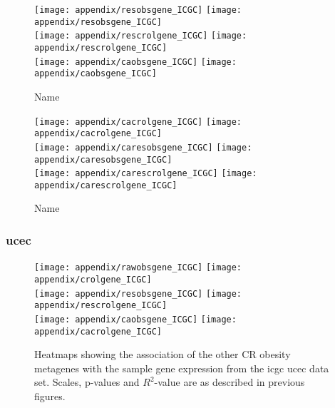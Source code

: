 \begin{appendices}
	\begin{figure}[htpb]
		\ContinuedFloat
		\captionsetup{list=off,format=cont}
		\centering
		\texttt{[image: appendix/resobsgene\_ICGC]}
		\hfill
		\texttt{[image: appendix/resobsgene\_ICGC]}\\
		\texttt{[image: appendix/rescrolgene\_ICGC]}
		\hfill
		\texttt{[image: appendix/rescrolgene\_ICGC]}\\
		\texttt{[image: appendix/caobsgene\_ICGC]}
		\hfill
		\texttt{[image: appendix/caobsgene\_ICGC]}\\
		\caption{Name}
	\end{figure}

	\begin{figure}[htpb]
		\ContinuedFloat
		\captionsetup{list=off,format=cont}
		\centering
		\texttt{[image: appendix/cacrolgene\_ICGC]}
		\hfill
		\texttt{[image: appendix/cacrolgene\_ICGC]}\\
		\texttt{[image: appendix/caresobsgene\_ICGC]}
		\hfill
		\texttt{[image: appendix/caresobsgene\_ICGC]}\\
		\texttt{[image: appendix/carescrolgene\_ICGC]}
		\hfill
		\texttt{[image: appendix/carescrolgene\_ICGC]}\\
		\caption{Name}
	\end{figure}

	\newpage

	\subsubsection{\gls{ucec}}
	\label{ssub:ucec}
	
	\begin{figure}[htp!]
		\centering
		\texttt{[image: appendix/rawobsgene\_ICGC]}
		\hfill
		\texttt{[image: appendix/crolgene\_ICGC]}\\
		\texttt{[image: appendix/resobsgene\_ICGC]}
		\hfill
		\texttt{[image: appendix/rescrolgene\_ICGC]}\\
		\texttt{[image: appendix/caobsgene\_ICGC]}
		\hfill
		\texttt{[image: appendix/cacrolgene\_ICGC]}\\
		\caption{Heatmaps showing the association of the other CR obesity metagenes with the sample gene expression from the \gls{icgc} \gls{ucec} data set.
		Scales, p-values and $R^2$-value are as described in previous figures.}
		\label{fig:degmetaicgc_ucec}
	\end{figure}


\end{appendices}
